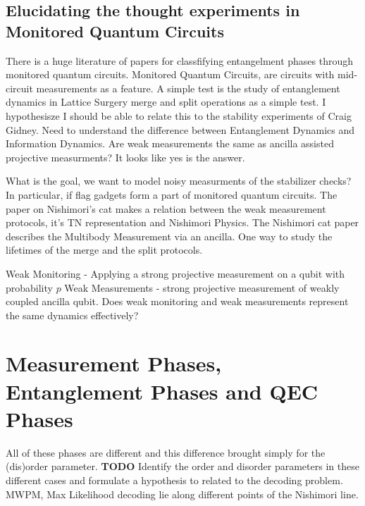 \documentclass[%
 reprint,
amsmath,amssymb,
aps,
onecolumn,
]{revtex4-2}
\begin{document}
\subsection{Elucidating the thought experiments in Monitored Quantum Circuits}
There is a huge literature of papers for classfifying entangelment phases through monitored quantum circuits. Monitored Quantum Circuits, are circuits with mid-circuit measurements as a feature. A simple test is the study of entanglement dynamics in Lattice Surgery merge and split operations as a simple test. I hypothesisze I should be able to relate this to the stability experiments of Craig Gidney. Need to understand the difference between Entanglement Dynamics and Information Dynamics. Are weak measurements the same as ancilla assisted projective measurments? It looks like yes is the answer. 

What is the goal, we want to model noisy measurments of the stabilizer checks? In particular, if flag gadgets form a part of monitored quantum circuits. The paper on Nishimori's cat makes a relation between the weak measurement protocols, it's TN representation and Nishimori Physics. The Nishimori cat paper describes the Multibody Measurement via an ancilla. One way to study the lifetimes of the merge and the split protocols. 


Weak Monitoring - Applying a strong projective measurement on a qubit with probability \(p\)
Weak Measurements - strong projective measurement of weakly coupled ancilla qubit.
Does weak monitoring and weak measurements represent the same dynamics effectively?


\section{Measurement Phases, Entanglement Phases and QEC Phases}
All of these phases are different and this difference brought simply for the (dis)order parameter. \textbf{TODO} Identify the order and disorder parameters in these different cases and formulate a hypothesis to related to the decoding problem. MWPM, Max Likelihood decoding lie along different points of the Nishimori line.
\end{document}
